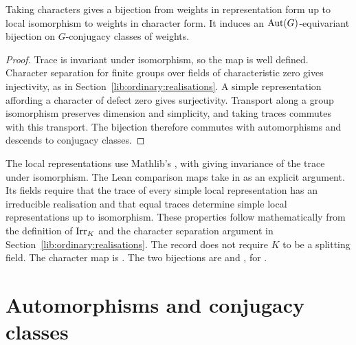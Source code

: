 \begin{proposition}
Taking characters gives a bijection from weights in representation form up to
local isomorphism to weights in character form. It induces an
$\operatorname{Aut}(G)$-equivariant bijection on $G$-conjugacy classes of weights.
\end{proposition}
\begin{proof}
Trace is invariant under isomorphism, so the map is well defined.
Character separation for finite groups over fields of characteristic
zero gives injectivity, as in Section~\ref{lib:ordinary:realisations}.
A simple representation affording a character of defect zero gives
surjectivity. Transport along a group isomorphism preserves dimension
and simplicity, and taking traces commutes with this transport.
The bijection therefore commutes with automorphisms and descends to
conjugacy classes.
\end{proof}

\begin{implementation}
The local representations use Mathlib's , with
 giving invariance of the trace under isomorphism.
The Lean comparison maps take
 in
 as an explicit argument.
Its fields require that the trace of every simple local representation
has an irreducible realisation and that equal traces determine simple
local representations up to isomorphism. These properties follow
mathematically from the definition of $\operatorname{Irr}_K$ and the character
separation argument in Section~\ref{lib:ordinary:realisations}.
The record does not require $K$ to be a splitting field.
The character map is
.
The two bijections are
 and
, for
.
\end{implementation}

\section{Automorphisms and conjugacy classes}


